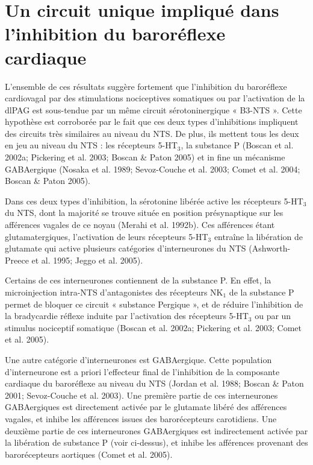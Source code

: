 \documentclass[a4paper,12pt,twoside]{report}
\begin{document}
\section{Un circuit unique impliqué dans l’inhibition du baroréflexe cardiaque}

L’ensemble de ces résultats suggère fortement que l’inhibition du baroréflexe cardiovagal par des stimulations nociceptives somatiques ou par l’activation de la dlPAG est sous-tendue par un même circuit sérotoninergique « B3-NTS ». Cette hypothèse est corroborée par le fait que ces deux types d’inhibitions impliquent des circuits très similaires au niveau du NTS. De plus, ils mettent tous les deux en jeu au niveau du NTS : les récepteurs 5-HT$_{3}$, la substance P (Boscan et al. 2002a; Pickering et al. 2003; Boscan \& Paton 2005) et in fine un mécanisme GABAergique (Nosaka et al. 1989; Sevoz-Couche et al. 2003; Comet et al. 2004; Boscan \& Paton 2005). 

Dans ces deux types d’inhibition, la sérotonine libérée active les récepteurs 5-HT$_{3}$ du NTS, dont la majorité se trouve située en position présynaptique sur les afférences vagales de ce noyau (Merahi et al. 1992b). Ces afférences étant glutamatergiques, l’activation de leurs récepteurs 5-HT$_{3}$ entraîne la libération de glutamate qui active plusieurs catégories d’interneurones du NTS (Ashworth-Preece et al. 1995; Jeggo et al. 2005). 

Certains de ces interneurones contiennent de la substance P. En effet, la microinjection intra-NTS d’antagonistes des récepteurs NK$_{1}$ de la substance P permet de bloquer ce circuit « substance Pergique », et de réduire l’inhibition de la bradycardie réflexe induite par l’activation des récepteurs 5-HT$_{3}$ ou par un stimulus nociceptif somatique (Boscan et al. 2002a; Pickering et al. 2003; Comet et al. 2005).

Une autre catégorie d’interneurones est GABAergique. Cette population d’interneurone est a priori l’effecteur final de l’inhibition de la composante cardiaque du baroréflexe au niveau du NTS (Jordan et al. 1988; Boscan \& Paton 2001; Sevoz-Couche et al. 2003). Une première partie de ces interneurones GABAergiques est directement activée par le glutamate libéré des afférences vagales, et inhibe les afférences issues des barorécepteurs carotidiens. Une deuxième partie de ces interneurones GABAergiques est indirectement activée par la libération de substance P (voir ci-dessus), et inhibe les afférences provenant des barorécepteurs aortiques (Comet et al. 2005).
\end{document}
